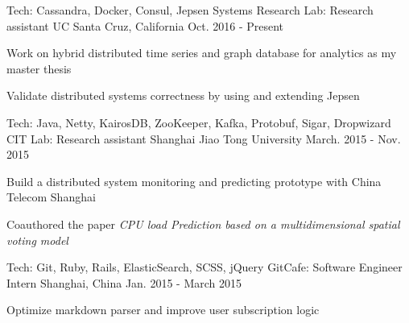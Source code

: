 

\begin{cventries}

  \cventry
    {Tech: Cassandra, Docker, Consul, Jepsen} %
    {Systems Research Lab: Research assistant} %
    {UC Santa Cruz, California} %
    {Oct. 2016 - Present} %
    {
      \begin{cvitems} %
        \item {Work on hybrid distributed time series and graph database for analytics as my master thesis}
        \item {Validate distributed systems correctness by using and extending Jepsen}
      \end{cvitems}
    }

    \cventry
      {Tech: Java, Netty, KairosDB, ZooKeeper, Kafka, Protobuf, Sigar, Dropwizard} %
      {CIT Lab: Research assistant} %
      {Shanghai Jiao Tong University} %
      {March. 2015 - Nov. 2015} %
      {
        \begin{cvitems} %
          \item {Build a distributed system monitoring and predicting prototype with China Telecom Shanghai}
          \item {Coauthored the paper \textit{CPU load Prediction based on a multidimensional spatial voting model}}
        \end{cvitems}
      }


  \cventry
    {Tech: Git, Ruby, Rails, ElasticSearch, SCSS, jQuery} %
    {GitCafe: Software Engineer Intern} %
    {Shanghai, China} %
    {Jan. 2015 - March 2015} %
    {
      \begin{cvitems} %
        \item {Optimize markdown parser and improve user subscription logic}
      \end{cvitems}
    }


\end{cventries}

